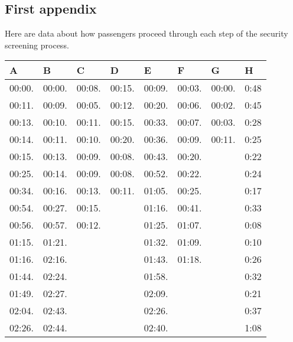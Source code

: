 \documentclass{mcmthesis}
\begin{document}
\begin{appendices}

\section{First appendix}
Here are data  about how passengers proceed through each step of the security screening process. \\
\begin{table}[htbp]
\centering
\begin{tabular}{m{1.3cm}<{\centering}m{1.3cm}<{\centering}m{1.3cm}<{\centering}m{1.3cm}<{\centering}m{1.3cm}<{\centering}m{1.3cm}<{\centering}m{1.3cm}<{\centering}m{1.3cm}<{\centering}}
\toprule
\textbf{A}&\textbf{B}&\textbf{C}&\textbf{D}&\textbf{E}&\textbf{F}&\textbf{G}&\textbf{H}\\
\midrule					
00:00.&	00:00.&	00:08.&	00:15.&	00:09.&	00:03.&	00:00.&	0:48\\
00:11.&	00:09.&	00:05.&	00:12.&	00:20.&	00:06.&	00:02.&	0:45\\
00:13.&	00:10.&	00:11.&	00:15.&	00:33.&	00:07.&	00:03.&	0:28\\
00:14.&	00:11.&	00:10.&	00:20.&	00:36.&	00:09.&	00:11.&	0:25\\
00:15.&	00:13.&	00:09.&	00:08.&	00:43.&	00:20.&		&	0:22\\
00:25.&	00:14.&	00:09.&	00:08.&	00:52.&	00:22.&		&	0:24\\
00:34.&	00:16.&	00:13.&	00:11.&	01:05.&	00:25.&		&	0:17\\
00:54.&	00:27.&	00:15.&		&	01:16.&	00:41.&		&	0:33\\
00:56.&	00:57.&	00:12.&		&	01:25.&	01:07.&		&	0:08\\
01:15.&	01:21.&		&		&	01:32.&	01:09.&		&	0:10\\
01:16.&	02:16.&		&		&	01:43.&	01:18.&		&	0:26\\
01:44.&	02:24.&		&		&	01:58.&		&		&	0:32\\
01:49.&	02:27.&		&		&	02:09.&		&		&	0:21\\
02:04.&	02:43.&		&		&	02:26.&		&		&	0:37\\
02:26.&	02:44.&		&		&	02:40.&		&		&	1:08\\
					

\end{tabular}
\end{table}
\end{appendices}
\end{document}
